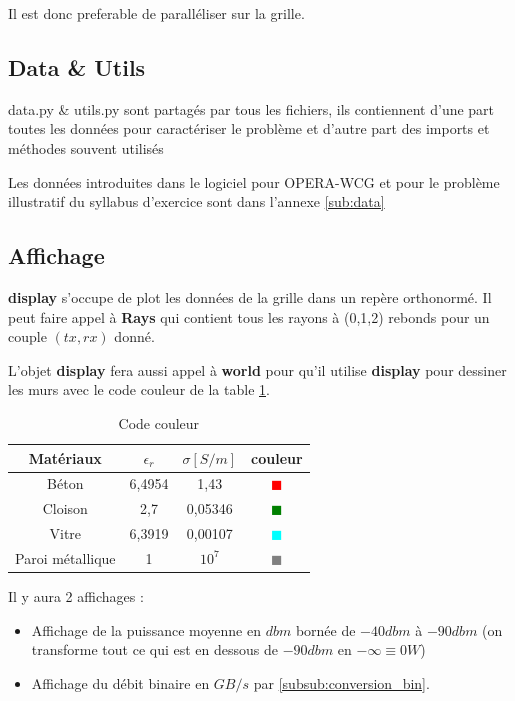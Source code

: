\documentclass[sn-mathphys-num]{sn-jnl}
\begin{document}
Il est donc preferable de paralléliser sur la grille.





\subsection{Data \& Utils}
data.py \& utils.py sont partagés par tous les fichiers, 
ils contiennent d'une part toutes les données pour
caractériser le problème et d'autre part des imports et méthodes souvent utilisés

Les données introduites dans le logiciel pour OPERA-WCG et pour le problème illustratif
du syllabus d'exercice sont dans l'annexe \ref{sub:data}

\subsection{Affichage}
\textbf{display} s'occupe de plot les données de la grille dans un repère orthonormé. Il peut faire appel à \textbf{Rays}
qui contient tous les rayons à (0,1,2) rebonds pour un couple $(tx,rx)$ donné.

L'objet \textbf{display} fera aussi appel à \textbf{world} pour qu'il utilise \textbf{display}
pour dessiner les murs avec le code couleur de la table \ref{tab:code_couleur}.

\begin{table}[htbp]
    \caption{Code couleur}
    \label{tab:code_couleur}
    
\begin{tabular}{|c|c|c|c|} 
    \toprule
    Matériaux & $\epsilon_r$ & $\sigma[S/m]$ & couleur \\
    \midrule
    Béton & 6,4954 & 1,43 & \textcolor{red}{$\blacksquare$}\\
    \midrule
    Cloison & 2,7 & 0,05346 & \textcolor{green}{$\blacksquare$}\\
    \midrule
    Vitre & 6,3919 & 0,00107 & \textcolor{cyan}{$\blacksquare$}\\
    \midrule
    Paroi métallique  & 1 & $10^7$ & \textcolor{gray}{$\blacksquare$} \\
    \bottomrule
\end{tabular}
\end{table}

Il y aura 2 affichages :
\begin{itemize}
    \item Affichage de la puissance moyenne en $dbm$ bornée de $-40dbm$ à $-90dbm$
    (on transforme tout ce qui est en dessous de $-90dbm$ en $-\infty \equiv 0W$)
    \item Affichage du débit binaire en $GB/s$ par \ref{subsub:conversion_bin}.
\end{itemize}
\end{document}
